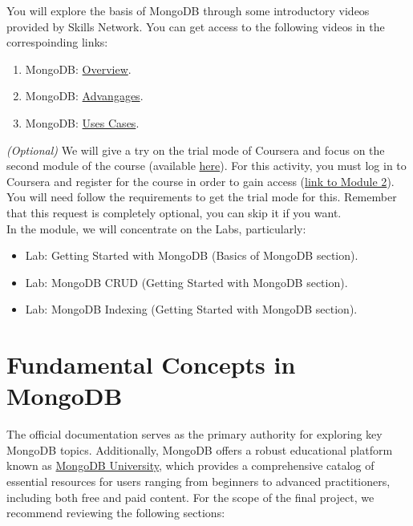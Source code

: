 \documentclass{article}
\begin{document}
You will explore the basis of MongoDB through some introductory videos provided by Skills Network.  You can get access to the following videos in the correspoinding links:

\begin{enumerate}
    \item MongoDB: \href{https://drive.google.com/file/d/1Zy8JrNUHdTJEN1fKGt_WsP9VemwUIoR3/view?usp=drive_link}{Overview}.
    \item MongoDB: \href{https://drive.google.com/file/d/1rxBzyJSaYguZakRydyjWxnxGp4oINfPv/view?usp=drive_link}{Advangages}.
    \item MongoDB: \href{https://drive.google.com/file/d/1mO9VbdRoD7DBIoq_m80_wwoAHwbT8Cn9/view?usp=drive_link}{Uses Cases}.
\end{enumerate}

\textit{(Optional)} We will give a try on the trial mode of Coursera and focus on the second module of the course (available \href{https://www.coursera.org/learn/introduction-to-nosql-databases}{here}). For this activity, you must log in to Coursera and register for the course in order to gain access (\href{https://www.coursera.org/learn/introduction-to-nosql-databases/home/module/2}{link to Module 2}).  You will need follow the requirements to get the trial mode for this.  Remember that this request is completely optional, you can skip it if you want.\\

In the module, we will concentrate on the Labs, particularly:

\begin{itemize}
    \item Lab: Getting Started with MongoDB (Basics of MongoDB section).
    \item Lab: MongoDB CRUD (Getting Started with MongoDB section).
    \item Lab: MongoDB Indexing (Getting Started with MongoDB section).
\end{itemize}

\section{Fundamental Concepts in MongoDB}
The official documentation serves as the primary authority for exploring key MongoDB topics. Additionally, MongoDB offers a robust educational platform known as \href{[https://learn.mongodb.com/](https://learn.mongodb.com/)}{MongoDB University}, which provides a comprehensive catalog of essential resources for users ranging from beginners to advanced practitioners, including both free and paid content. For the scope of the final project, we recommend reviewing the following sections:
\end{document}
